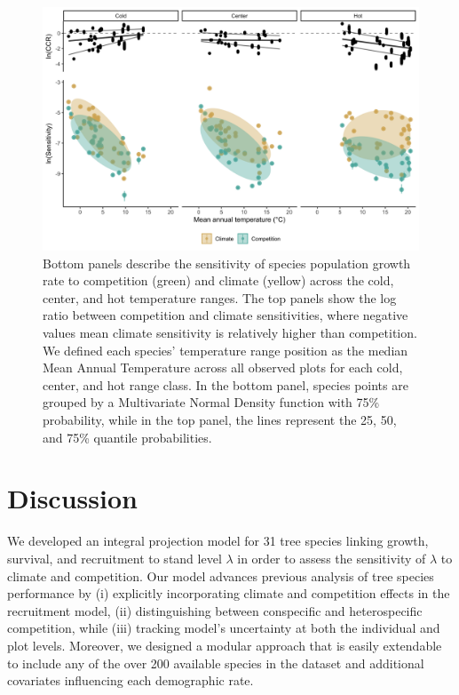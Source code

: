 \hypertarget{fig:temp_vs_comp}{%
\begin{figure}
\centering
\includegraphics[width=1\textwidth,height=\textheight]{manuscript/figs/fig-sensBorder_temp-1.png}
\caption[{Bottom panels describe the sensitivity of species population
growth rate to competition (green) and climate (yellow) across the cold,
center, and hot temperature ranges.}]{Bottom panels describe the
sensitivity of species population growth rate to competition (green) and
climate (yellow) across the cold, center, and hot temperature ranges.
The top panels show the log ratio between competition and climate
sensitivities, where negative values mean climate sensitivity is
relatively higher than competition. We defined each species' temperature
range position as the median Mean Annual Temperature across all observed
plots for each cold, center, and hot range class. In the bottom panel,
species points are grouped by a Multivariate Normal Density function
with 75\% probability, while in the top panel, the lines represent the
25, 50, and 75\% quantile probabilities.}
\label{fig:temp_vs_comp}
\end{figure}
}

\hypertarget{discussion}{%
\section{Discussion}\label{discussion}}

We developed an integral projection model for 31 tree species linking
growth, survival, and recruitment to stand level \(\lambda\) in order to
assess the sensitivity of \(\lambda\) to climate and competition. Our
model advances previous analysis of tree species performance by (i)
explicitly incorporating climate and competition effects in the
recruitment model, (ii) distinguishing between conspecific and
heterospecific competition, while (iii) tracking model's uncertainty at
both the individual and plot levels. Moreover, we designed a modular
approach that is easily extendable to include any of the over 200
available species in the dataset and additional covariates influencing
each demographic rate.\\

